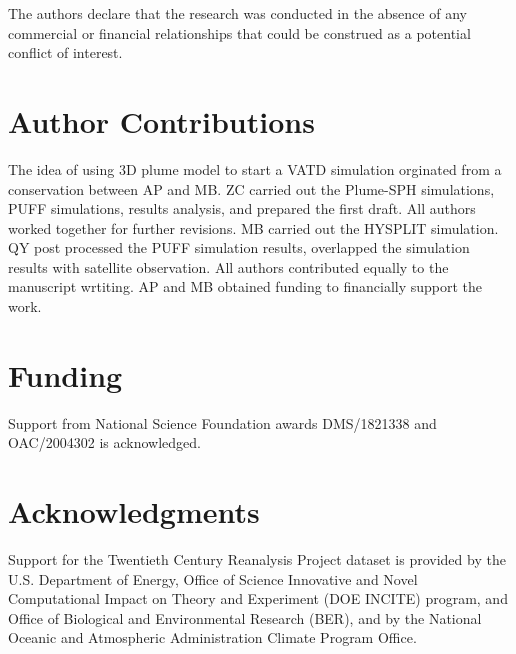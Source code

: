 \documentclass[utf8]{frontiersSCNS} %
\begin{document}
The authors declare that the research was conducted in the absence of any commercial or financial relationships that could be construed as a potential conflict of interest.

\section*{Author Contributions}
The idea of using 3D plume model to start a VATD simulation orginated from a conservation between AP and MB. ZC carried out the Plume-SPH simulations, PUFF simulations, results analysis, and prepared the first draft. All authors worked together for further revisions.  MB carried out the HYSPLIT simulation. QY post processed the PUFF simulation results, overlapped the simulation results with satellite observation. All authors contributed equally to the manuscript wrtiting. AP and MB obtained funding to financially support the work.

\section*{Funding}
Support from National Science Foundation awards  DMS/1821338  and OAC/2004302  is acknowledged.
\section*{Acknowledgments}
Support for the Twentieth Century Reanalysis Project dataset is provided by the U.S. Department of Energy, Office of Science Innovative and Novel Computational Impact on Theory and Experiment (DOE INCITE) program, and Office of Biological and Environmental Research (BER), and by the National Oceanic and Atmospheric Administration Climate Program Office.

\end{document}

